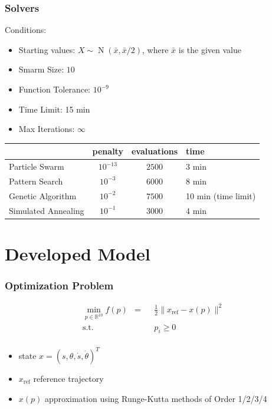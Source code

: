 \documentclass{beamer}
\begin{document}
\begin{frame}
	\frametitle{Solvers}
	Conditions:
	\begin{itemize}
		\item{Starting values: $X\sim \operatorname{N}\left(\bar{x},\bar{x}/2\right)$, where $\bar{x}$ is the given value}
		\item{Smarm Size: $10$}
		\item{Function Tolerance: $10^{-9}$}
		\item{Time Limit: 15 min}
		\item{Max Iterations: $\infty$}
	\end{itemize}
	
	 \vspace{0.5cm}
	
	\begin{tabular}{l|ccl}
		& penalty & evaluations & time \\
		\hline
		Particle Swarm & $10^{-13}$ & $2500$ & 3 min \\
		Pattern Search & $10^{-3}$ & $6000$ & 8 min \\
		Genetic Algorithm & $10^{-2}$ & $7500$ & 10 min (time limit) \\
		Simulated Annealing & $10^{-1}$ & $3000$ & 4 min \\
	\end{tabular}
\end{frame}




\section{Developed Model}

\begin{frame}
    \frametitle{Optimization Problem}
    \begin{align*}
        \min_{p\in\mathbb{R}^{10}} f(p) & = & & \frac{1}{2} \| x_{\text{ref}} - x(p) \|^2 \\
        \operatorname{s.t.} & & & p_i \geq 0 \\
    \end{align*}

    \begin{itemize}
        \item{state $x = (s,\theta,\dot{s},\dot{\theta})^T$}
        \item{$x_{\text{ref}}$ reference trajectory}
        \item{$x(p)$ approximation using Runge-Kutta methods of Order 1/2/3/4}
    \end{itemize}
\end{frame}
\end{document}
